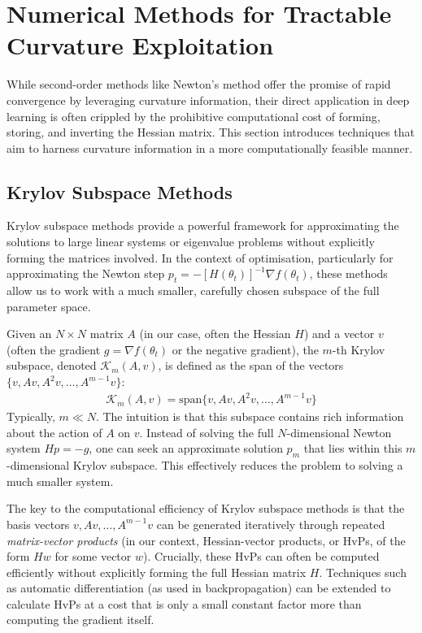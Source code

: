 \section{Numerical Methods for Tractable Curvature Exploitation}
\label{sec:numerical_methods_for_tractable_curvature_exploitation}

While second-order methods like Newton's method offer the promise of rapid convergence by leveraging curvature information, their direct application in deep learning is often crippled by the prohibitive computational cost of forming, storing, and inverting the Hessian matrix. This section introduces techniques that aim to harness curvature information in a more computationally feasible manner.

\subsection{Krylov Subspace Methods}
\label{ssec:krylov_methods}

Krylov subspace methods provide a powerful framework for approximating the solutions to large linear systems or eigenvalue problems without explicitly forming the matrices involved. In the context of optimisation, particularly for approximating the Newton step $p_t = -[H(\theta_t)]^{-1} \nabla f(\theta_t)$, these methods allow us to work with a much smaller, carefully chosen subspace of the full parameter space.

Given an $N \times N$ matrix $A$ (in our case, often the Hessian $H$) and a vector $v$ (often the gradient $g = \nabla f(\theta_t)$ or the negative gradient), the $m$-th Krylov subspace, denoted $\mathcal{K}_m(A, v)$, is defined as the span of the vectors $\{v, Av, A^2v, \ldots, A^{m-1}v\}$:
\begin{align}
    \mathcal{K}_m(A, v) = \text{span}\{v, Av, A^2v, \ldots, A^{m-1}v\}
    \label{eq:krylov_subspace_definition}
\end{align}
Typically, $m \ll N$. The intuition is that this subspace contains rich information about the action of $A$ on $v$. Instead of solving the full $N$-dimensional Newton system $H p = -g$, one can seek an approximate solution $p_m$ that lies within this $m$-dimensional Krylov subspace. This effectively reduces the problem to solving a much smaller system.

The key to the computational efficiency of Krylov subspace methods is that the basis vectors $v, Av, \ldots, A^{m-1}v$ can be generated iteratively through repeated \textit{matrix-vector products} (in our context, Hessian-vector products, or HvPs, of the form $Hw$ for some vector $w$). Crucially, these HvPs can often be computed efficiently without explicitly forming the full Hessian matrix $H$. Techniques such as automatic differentiation (as used in backpropagation) can be extended to calculate HvPs at a cost that is only a small constant factor more than computing the gradient itself.

